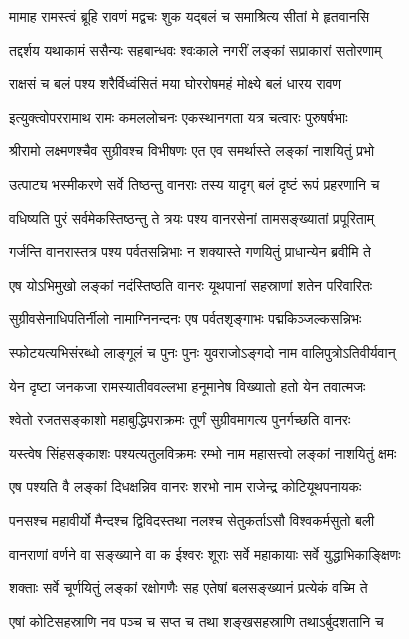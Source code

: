 \twolineshloka
{मामाह रामस्त्वं ब्रूहि रावणं मद्वचः शुक}
{यद्बलं च समाश्रित्य सीतां मे हृतवानसि} %

\twolineshloka
{तद्दर्शय यथाकामं ससैन्यः सहबान्धवः}
{श्वःकाले नगरीं लङ्कां सप्राकारां सतोरणाम्} %

\twolineshloka
{राक्षसं च बलं पश्य शरैर्विध्वंसितं मया}
{घोररोषमहं मोक्ष्ये बलं धारय रावण} %

\twolineshloka
{इत्युक्त्वोपररामाथ रामः कमललोचनः}
{एकस्थानगता यत्र चत्वारः पुरुषर्षभाः} %

\twolineshloka
{श्रीरामो लक्ष्मणश्चैव सुग्रीवश्च विभीषणः}
{एत एव समर्थास्ते लङ्कां नाशयितुं प्रभो} %

\twolineshloka
{उत्पाट्य भस्मीकरणे सर्वे तिष्ठन्तु वानराः}
{तस्य यादृग् बलं दृष्टं रूपं प्रहरणानि च} %

\twolineshloka
{वधिष्यति पुरं सर्वमेकस्तिष्ठन्तु ते त्रयः}
{पश्य वानरसेनां तामसङ्ख्यातां प्रपूरिताम्} %

\twolineshloka
{गर्जन्ति वानरास्तत्र पश्य पर्वतसन्निभाः}
{न शक्यास्ते गणयितुं प्राधान्येन ब्रवीमि ते} %

\twolineshloka
{एष योऽभिमुखो लङ्कां नदंस्तिष्ठति वानरः}
{यूथपानां सहस्राणां शतेन परिवारितः} %

\twolineshloka
{सुग्रीवसेनाधिपतिर्नीलो नामाग्निनन्दनः}
{एष पर्वतशृङ्गाभः पद्मकिञ्जल्कसन्निभः} %

\twolineshloka
{स्फोटयत्यभिसंरब्धो लाङ्गूलं च पुनः पुनः}
{युवराजोऽङ्गदो नाम वालिपुत्रोऽतिवीर्यवान्} %

\twolineshloka
{येन दृष्टा जनकजा रामस्यातीववल्लभा}
{हनूमानेष विख्यातो हतो येन तवात्मजः} %

\twolineshloka
{श्वेतो रजतसङ्काशो महाबुद्धिपराक्रमः}
{तूर्णं सुग्रीवमागत्य पुनर्गच्छति वानरः} %

\twolineshloka
{यस्त्वेष सिंहसङ्काशः पश्यत्यतुलविक्रमः}
{रम्भो नाम महासत्त्वो लङ्कां नाशयितुं क्षमः} %

\twolineshloka
{एष पश्यति वै लङ्कां दिधक्षन्निव वानरः}
{शरभो नाम राजेन्द्र कोटियूथपनायकः} %

\twolineshloka
{पनसश्च महावीर्यो मैन्दश्च द्विविदस्तथा}
{नलश्च सेतुकर्ताऽसौ विश्वकर्मसुतो बली} %

\twolineshloka
{वानराणां वर्णने वा सङ्ख्याने वा क ईश्वरः}
{शूराः सर्वे महाकायाः सर्वे युद्धाभिकाङ्क्षिणः} %

\twolineshloka
{शक्ताः सर्वे चूर्णयितुं लङ्कां रक्षोगणैः सह}
{एतेषां बलसङ्ख्यानं प्रत्येकं वच्मि ते} %

\twolineshloka
{एषां कोटिसहस्राणि नव पञ्च च सप्त च}
{तथा शङ्खसहस्राणि तथाऽर्बुदशतानि च} %

